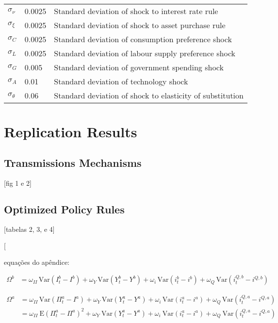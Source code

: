 \documentclass[12pt]{article}
\begin{document}
\begin{table}
\begin{tabular}{lll}
        $\sigma_\nu$ & 0.0025 & Standard deviation of shock to interest rate rule \\
        $\sigma_{\xi}$ & 0.0025 & Standard deviation of shock to asset purchase rule \\
        $\sigma_C$ & 0.0025 & Standard deviation of consumption preference shock \\
        $\sigma_L$ & 0.0025 & Standard deviation of labour supply preference shock \\
        $\sigma_G$ & 0.005 & Standard deviation of government spending shock \\
        $\sigma_A$ & 0.01 & Standard deviation of technology shock \\
        $\sigma_\theta$ & 0.06 & Standard deviation of shock to elasticity of substitution \\
        \hline
    \end{tabular}
\end{table}




\section{Replication Results}

\subsection{Transmissions Mechanisms}

[fig 1 e 2]


\subsection{Optimized Policy Rules}

[tabelas 2, 3, e 4]

[
    
equações do apêndice:

\begin{align*}
    \Omega^{b}&=\omega_{I I}\,\mathrm{Var}(I_{t}^{b}-I^{b})+\omega_{Y}\,\mathrm{Var}(Y_{t}^{b}-Y^{b})+\omega_{i}\,\mathrm{Var}(i_{t}^{b}-i^{b})+\omega_{Q}\,\mathrm{Var}(i_{t}^{Q,b}-i^{Q,b})
\end{align*}

\begin{align*}
    \Omega^{a}&=\omega_{I I}\,\mathrm{Var}(\Pi_{t}^{a}-I^{a})+\omega_{Y}\,\mathrm{Var}(Y_{t}^{a}-Y^{a})+\omega_{i}\,\mathrm{Var}(i_{t}^{a}-i^{a})+\omega_{Q}\,\mathrm{Var}(i_{t}^{Q,a}-i^{Q,a})\\
    &=\omega_{I I}~\mathrm{E}(\Pi_{t}^{a}-\Pi^{a})^{2}+\omega_{Y}~\mathrm{Var}(Y_{t}^{a}-Y^{a})+\omega_{i}~\mathrm{Var}(i_{t}^{a}-i^{a})+\omega_{Q}~\mathrm{Var}(i_{t}^{Q,a}-i^{Q,a})
\end{align*}
\end{document}
